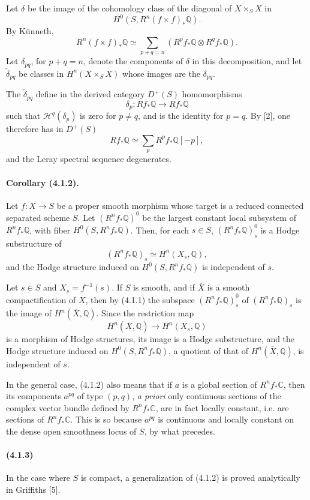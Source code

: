 \documentclass[10pt]{article}
\newcommand{\C}{\mathbb C}
\newcommand{\Q}{\mathbb Q}
\begin{document}
Let $\delta$ be the image of the cohomology class of the diagonal of $X\times_SX$ in
\[
H^0(S,R^n(f\times f)_*\Q).
\]
By Künneth,
\[
R^n(f\times f)_*\Q\simeq
\sum_{p+q=n}(R^pf_*\Q\otimes R^qf_*\Q).
\]
Let $\delta_{pq}$, for $p+q=n$, denote the components of $\delta$ in this decomposition, and let $\widetilde\delta_{pq}$ be classes in $H^n(X\times_SX)$ whose images are the $\delta_{pq}$.

The $\widetilde\delta_{pq}$ define in the derived category $D^+(S)$ homomorphisms
\[
\delta_p:Rf_*\Q\longrightarrow Rf_*\Q
\]
such that $\mathcal H^q(\delta_p)$ is zero for $p\ne q$, and is the identity for $p=q$. By [2], one therefore has in $D^+(S)$
\[
\tag{4.1.1.1}
Rf_*\Q\simeq\sum_p R^pf_*\Q[-p],
\]
and the Leray spectral sequence degenerates.

\paragraph{Corollary (4.1.2).} Let $f:X\to S$ be a proper smooth morphism whose target is a reduced connected separated scheme $S$. Let $(R^nf_*\Q)^0$ be the largest constant local subsystem of $R^nf_*\Q$, with fiber $H^0(S,R^nf_*\Q)$. Then, for each $s\in S$, $(R^nf_*\Q)^0_s$ is a Hodge substructure of
\[
(R^nf_*\Q)_s\simeq H^n(X_s,\Q),
\]
and the Hodge structure induced on $H^0(S,R^nf_*\Q)$ is independent of $s$.

Let $s\in S$ and $X_s=f^{-1}(s)$. If $S$ is smooth, and if $\overline X$ is a smooth compactification of $X$, then by (4.1.1) the subspace $(R^nf_*\Q)^0_s$ of $(R^nf_*\Q)_s$ is the image of $H^n(\overline X,\Q)$. Since the restriction map
\[
H^n(\overline X,\Q)\longrightarrow H^n(X_s,\Q)
\]
is a morphism of Hodge structures, its image is a Hodge substructure, and the Hodge structure induced on $H^0(S,R^nf_*\Q)$, a quotient of that of $H^n(\overline X,\Q)$, is independent of $s$.

In the general case, (4.1.2) also means that if $a$ is a global section of $R^nf_*\C$, then its components $a^{pq}$ of type $(p,q)$, \emph{a priori} only continuous sections of the complex vector bundle defined by $R^nf_*\C$, are in fact locally constant, i.e. are sections of $R^nf_*\C$. This is so because $a^{pq}$ is continuous and locally constant on the dense open smoothness locus of $S$, by what precedes.

\paragraph{(4.1.3)} In the case where $S$ is compact, a generalization of (4.1.2) is proved analytically in Griffiths [5].
\end{document}
